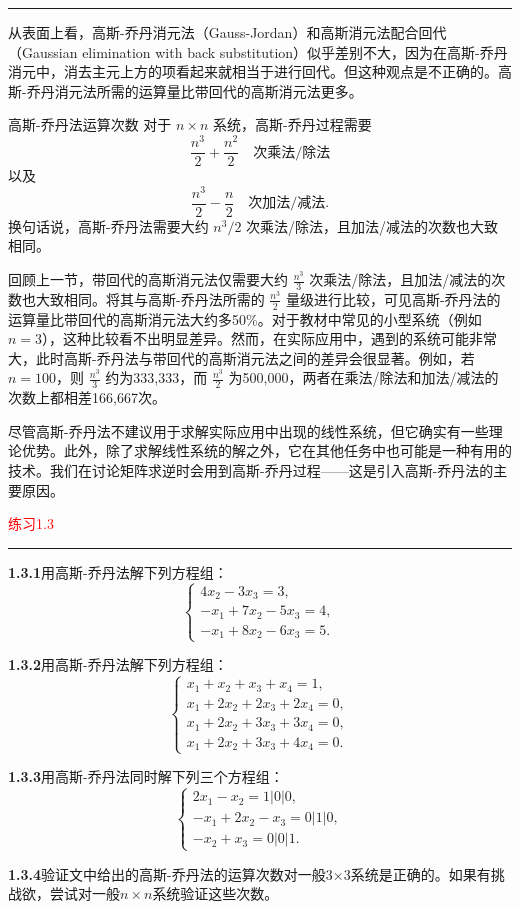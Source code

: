 \color{red}\rule{\textwidth}{0.4pt}\color{black}


从表面上看，高斯-乔丹消元法（Gauss-Jordan）和高斯消元法配合回代（Gaussian elimination with back substitution）似乎差别不大，因为在高斯-乔丹消元中，消去主元上方的项看起来就相当于进行回代。但这种观点是不正确的。高斯-乔丹消元法所需的运算量比带回代的高斯消元法更多。

\begin{bluebox}{高斯-乔丹法运算次数}
	对于 \( n \times n \) 系统，高斯-乔丹过程需要
	\[
	\frac{n^3}{2} + \frac{n^2}{2} \quad \text{次乘法/除法}
	\]
	以及
	\[
	\frac{n^3}{2} - \frac{n}{2} \quad \text{次加法/减法}.
	\]
	换句话说，高斯-乔丹法需要大约 \( n^3/2 \) 次乘法/除法，且加法/减法的次数也大致相同。
\end{bluebox}

回顾上一节，带回代的高斯消元法仅需要大约 \( \frac{n^3}{3} \) 次乘法/除法，且加法/减法的次数也大致相同。将其与高斯-乔丹法所需的 \( \frac{n^3}{2} \) 量级进行比较，可见高斯-乔丹法的运算量比带回代的高斯消元法大约多50\%。对于教材中常见的小型系统（例如 \( n = 3 \)），这种比较看不出明显差异。然而，在实际应用中，遇到的系统可能非常大，此时高斯-乔丹法与带回代的高斯消元法之间的差异会很显著。例如，若 \( n = 100 \)，则 \( \frac{n^3}{3} \) 约为333,333，而 \( \frac{n^3}{2} \) 为500,000，两者在乘法/除法和加法/减法的次数上都相差166,667次。

尽管高斯-乔丹法不建议用于求解实际应用中出现的线性系统，但它确实有一些理论优势。此外，除了求解线性系统的解之外，它在其他任务中也可能是一种有用的技术。我们在讨论矩阵求逆时会用到高斯-乔丹过程——这是引入高斯-乔丹法的主要原因。

\textcolor{red}{练习1.3}
\color{red}\rule{\textwidth}{0.4pt}\color{black}

\textbf{1.3.1}用高斯-乔丹法解下列方程组：
\[
\begin{cases}
	4x_2 - 3x_3 = 3, \\
	-x_1 + 7x_2 - 5x_3 = 4, \\
	-x_1 + 8x_2 - 6x_3 = 5.
\end{cases}
\]

\textbf{1.3.2}用高斯-乔丹法解下列方程组：
\[
\begin{cases}
	x_1 + x_2 + x_3 + x_4 = 1, \\
	x_1 + 2x_2 + 2x_3 + 2x_4 = 0, \\
	x_1 + 2x_2 + 3x_3 + 3x_4 = 0, \\
	x_1 + 2x_2 + 3x_3 + 4x_4 = 0.
\end{cases}
\]

\textbf{1.3.3}用高斯-乔丹法同时解下列三个方程组：
\[
\begin{cases}
	2x_1 - x_2 = 1 \big| 0 \big| 0, \\
	-x_1 + 2x_2 - x_3 = 0 \big| 1 \big| 0, \\
	-x_2 + x_3 = 0 \big| 0 \big| 1.
\end{cases}
\]

\textbf{1.3.4}验证文中给出的高斯-乔丹法的运算次数对一般3×3系统是正确的。如果有挑战欲，尝试对一般\( n \times n \)系统验证这些次数。




